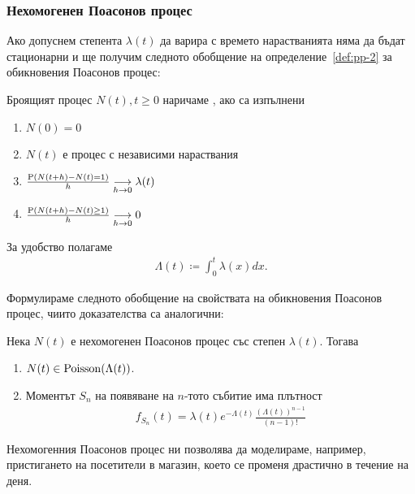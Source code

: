 \documentclass[numbers=endperiod, bibliography=totocnumbered]{scrartcl}
\begin{document}
\subsubsection{Нехомогенен Поасонов процес}

Ако допуснем степента \( \lambda(t) \) да варира с времето нарастванията няма да бъдат стационарни и ще получим следното обобщение на определение~\ref{def:pp-2} за обикновения Поасонов процес:
\begin{definition}
  Броящият процес \( N(t), t \geq 0 \) наричаме , ако са изпълнени
  \begin{enumerate}
    \item \( N(0) = 0 \)
    \item \( N(t) \) е процес с независими нараствания
    \item \( \frac {\Prob(N(t+h) - N(t) = 1)} h \Conv[h \to 0]{} \lambda(t) \)
    \item \( \frac {\Prob(N(t+h) - N(t) \geq 1)} h \Conv[h \to 0]{} 0 \)
  \end{enumerate}

  За удобство полагаме
  \begin{align*}
    \Lambda(t) \coloneqq \int_0^t \lambda(x) dx.
  \end{align*}
\end{definition}

Формулираме следното обобщение на свойствата на обикновения Поасонов процес, чиито доказателства са аналогични:
\begin{theorem}
  Нека \( N(t) \) е нехомогенен Поасонов процес със степен \( \lambda(t) \). Тогава
  \begin{enumerate}
    \item \( N(t) \in \DPoisson(\Lambda(t)) \).
    \item Моментът \( S_n \) на появяване на \( n \)-тото събитие има плътност
    \begin{align*}
      f_{S_n}(t) = \lambda(t) e^{-\Lambda(t)} \frac {{(\Lambda(t))}^{n-1}} {(n-1)!}
    \end{align*}
  \end{enumerate}
\end{theorem}

\begin{note}
  Нехомогенния Поасонов процес ни позволява да моделираме, например, пристигането на посетители в магазин, което се променя драстично в течение на деня.
\end{note}

\printbibliography
\end{document}

